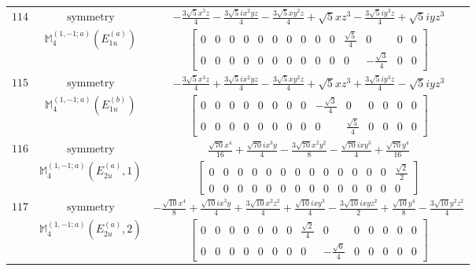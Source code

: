 \documentclass[fleqn,8pt,landscape]{jsarticle}
\begin{document}
\begin{longtable}{ccc}
$ 114 $ & $ \text{symmetry} $ & $ - \frac{3 \sqrt{5} x^{3} z}{4} - \frac{3 \sqrt{5} i x^{2} y z}{4} - \frac{3 \sqrt{5} x y^{2} z}{4} + \sqrt{5} x z^{3} - \frac{3 \sqrt{5} i y^{3} z}{4} + \sqrt{5} i y z^{3} $ \\
$  $ & $ \mathbb{M}_{4}^{(1,-1;a)}(E_{1u}^{(a)}) $ & $ \begin{bmatrix} 0 & 0 & 0 & 0 & 0 & 0 & 0 & 0 & 0 & 0 & \frac{\sqrt{5}}{4} & 0 & 0 & 0 \\ 0 & 0 & 0 & 0 & 0 & 0 & 0 & 0 & 0 & 0 & 0 & - \frac{\sqrt{3}}{4} & 0 & 0 \end{bmatrix} $ \\ \hline
$ 115 $ & $ \text{symmetry} $ & $ - \frac{3 \sqrt{5} x^{3} z}{4} + \frac{3 \sqrt{5} i x^{2} y z}{4} - \frac{3 \sqrt{5} x y^{2} z}{4} + \sqrt{5} x z^{3} + \frac{3 \sqrt{5} i y^{3} z}{4} - \sqrt{5} i y z^{3} $ \\
$  $ & $ \mathbb{M}_{4}^{(1,-1;a)}(E_{1u}^{(b)}) $ & $ \begin{bmatrix} 0 & 0 & 0 & 0 & 0 & 0 & 0 & 0 & - \frac{\sqrt{3}}{4} & 0 & 0 & 0 & 0 & 0 \\ 0 & 0 & 0 & 0 & 0 & 0 & 0 & 0 & 0 & \frac{\sqrt{5}}{4} & 0 & 0 & 0 & 0 \end{bmatrix} $ \\ \hline
$ 116 $ & $ \text{symmetry} $ & $ \frac{\sqrt{70} x^{4}}{16} + \frac{\sqrt{70} i x^{3} y}{4} - \frac{3 \sqrt{70} x^{2} y^{2}}{8} - \frac{\sqrt{70} i x y^{3}}{4} + \frac{\sqrt{70} y^{4}}{16} $ \\
$  $ & $ \mathbb{M}_{4}^{(1,-1;a)}(E_{2u}^{(a)},1) $ & $ \begin{bmatrix} 0 & 0 & 0 & 0 & 0 & 0 & 0 & 0 & 0 & 0 & 0 & 0 & 0 & \frac{\sqrt{2}}{2} \\ 0 & 0 & 0 & 0 & 0 & 0 & 0 & 0 & 0 & 0 & 0 & 0 & 0 & 0 \end{bmatrix} $ \\ \hline
$ 117 $ & $ \text{symmetry} $ & $ - \frac{\sqrt{10} x^{4}}{8} + \frac{\sqrt{10} i x^{3} y}{4} + \frac{3 \sqrt{10} x^{2} z^{2}}{4} + \frac{\sqrt{10} i x y^{3}}{4} - \frac{3 \sqrt{10} i x y z^{2}}{2} + \frac{\sqrt{10} y^{4}}{8} - \frac{3 \sqrt{10} y^{2} z^{2}}{4} $ \\
$  $ & $ \mathbb{M}_{4}^{(1,-1;a)}(E_{2u}^{(a)},2) $ & $ \begin{bmatrix} 0 & 0 & 0 & 0 & 0 & 0 & 0 & \frac{\sqrt{2}}{4} & 0 & 0 & 0 & 0 & 0 & 0 \\ 0 & 0 & 0 & 0 & 0 & 0 & 0 & 0 & - \frac{\sqrt{6}}{4} & 0 & 0 & 0 & 0 & 0 \end{bmatrix} $ \\ \hline

\end{longtable}
\end{document}
